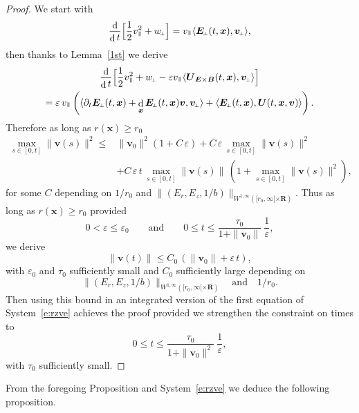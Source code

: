 \documentclass[10pt]{amsart}
\newcommand{\sperp}{{\scriptscriptstyle\perp}}
\let\eps\varepsilon
\let\d\partial
\DeclareMathOperator\dD{d}\let\dd\dD
\theoremstyle{plain}
\theoremstyle{definition}
\newcommand\R{\mathbf R}
\newcommand\bB{{\boldsymbol B}}
\newcommand\bE{{\boldsymbol E}}
\newcommand\bU{{\boldsymbol U}}
\newcommand\bfv{{\boldsymbol v}}
\newcommand\bfx{{\boldsymbol x}}
\newcommand\vpar{v_\mypar}
\newcommand\bvperp{\bfv_{\!\sperp}}
\newcommand\eperp{w_{\!\sperp}}
\newcommand\Eperp{\bE_{\!\sperp}}
\newcommand\Er{E_r}
\newcommand\Ez{E_z}
\newcommand{\EcB}{\bU_{\bE\times\bB}}
\newcommand{\mypar}{{\mkern3mu\vphantom{\perp}\vrule depth 0pt\mkern2mu\vrule depth 0pt\mkern3mu}}
\begin{document}
\begin{proof}
We start with
\[
\frac{\dD}{\dD t}\Bigl[\frac12\vpar^2+\eperp\Bigr]
=\vpar\langle \Eperp(t,\bfx),\bvperp\rangle,
\]
then thanks to Lemma~\ref{1st} we derive
\begin{multline*}
\frac{\dD}{\dD t}\Bigl[\frac12\vpar^2+\eperp
-\eps\vpar\langle\EcB(t,\bfx),\bvperp\rangle\Bigr]
\\
=\eps\,\vpar\left(\langle \d_t\Eperp(t,\bfx)+\dD_\bfx\Eperp(t,\bfx)\bfv,\bvperp\rangle
+\langle \Eperp(t,\bfx),\bU(t,\bfx,\bfv)\rangle\right).
\end{multline*}
Therefore as long as $r(\bfx)\geq r_0$
\begin{align*}
\max_{s\in[0,t]}\|\bfv(s)\|^2\leq{}&
\|\bfv_0\|^2(1+C\,\eps)+C\,\eps\,\max_{s\in[0,t]}\|\bfv(s)\|^2
\\
&+C\,\eps\,t\,\max_{s\in[0,t]}\|\bfv(s)\|\,(1+\max_{s\in[0,t]}\|\bfv(s)\|^2),
\end{align*}
for some $C$ depending on $1/r_0$ and $\|(\Er,\Ez,1/b)\|_{W^{1,\infty}([r_0,\infty[\times\R)}$. Thus as long as $r(\bfx)\geq r_0$ provided
\[
0<\eps\leq\eps_0\qquad\textrm{and}\qquad
0\leq t\leq \frac{\tau_0}{1+\|\bfv_0\|}\ \frac1\eps,
\]
we derive
\[
\|\bfv(t)\|\leq C_0\,(\|\bfv_0\|+\eps\,t),
\]
with $\eps_0$ and $\tau_0$ sufficiently small and $C_0$ sufficiently large
depending on
\[
\|(\Er,\Ez,1/b)\|_{W^{1,\infty}([r_0,\infty[\times\R)}\quad\text{and}\quad 1/r_0.
\]
Then using this bound in an integrated version of the first equation of System~\eqref{e:rzve} achieves the proof provided we strengthen the constraint on times to
\[
0\leq t\leq \frac{\tau_0}{1+\|\bfv_0\|^2}\ \frac1\eps,
\]
with $\tau_0$ sufficiently small.
\end{proof}

From the foregoing Proposition and System~\eqref{e:rzve} we deduce the following proposition.
\end{document}
